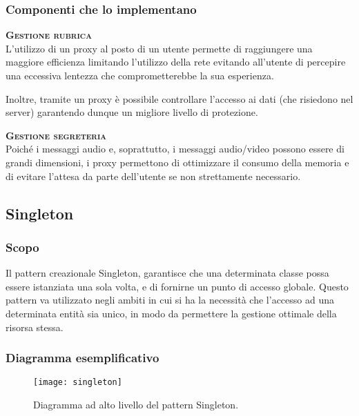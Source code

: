 \subsubsection{Componenti che lo implementano}
\begin{description}
  \item{\bfseries\scshape Gestione rubrica}\\
L'utilizzo di un proxy al posto di un utente permette di raggiungere una maggiore efficienza limitando l'utilizzo della rete evitando all'utente di percepire una eccessiva lentezza che comprometterebbe la sua esperienza.

Inoltre, tramite un proxy è possibile controllare l'accesso ai dati (che risiedono nel server) garantendo dunque un migliore livello di protezione.
  \item{\bfseries\scshape Gestione segreteria}\\
Poiché i messaggi audio e, soprattutto, i messaggi audio/video possono essere di grandi dimensioni, i proxy permettono di ottimizzare il consumo della memoria e di evitare l'attesa da parte dell'utente se non strettamente necessario.
\end{description}

\subsection{Singleton}

\subsubsection{Scopo}
Il pattern creazionale Singleton, garantisce che una determinata classe possa essere istanziata una sola volta, e di fornirne un punto di accesso globale. Questo pattern va utilizzato negli ambiti in cui si ha la necessità che l'accesso ad una determinata entità sia unico, in modo da permettere la gestione ottimale della risorsa stessa.

\subsubsection{Diagramma esemplificativo}
\begin{figure}[H]
\centering
\texttt{[image: singleton]}
\caption{Diagramma ad alto livello del pattern Singleton.}\label{fig:singleton}
\end{figure}

